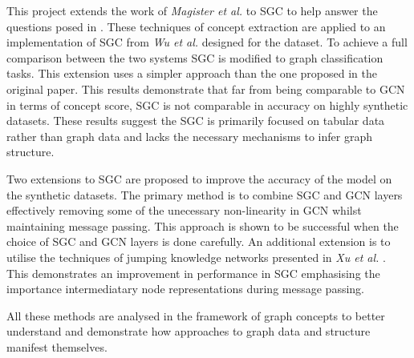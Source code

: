 
This project extends the work of \textit{Magister et al.} \cite{magister2021gcexplainer} to SGC \cite{wu2019simplifying} to help answer the questions posed in .
These techniques of concept extraction are applied to an implementation of SGC from \textit{Wu et al.} designed for the dataset.
To achieve a full comparison between the two systems SGC is modified to graph classification tasks. 
This extension uses a simpler approach than the one proposed in the original paper.
This results demonstrate that far from being comparable to GCN in terms of concept score, SGC is not comparable in accuracy on highly synthetic datasets.
These results suggest the SGC is primarily focused on tabular data rather than graph data and lacks the necessary mechanisms to infer graph structure.

Two extensions to SGC are proposed to improve the accuracy of the model on the synthetic datasets.
The primary method is to combine SGC and GCN layers effectively removing some of the unecessary non-linearity in GCN whilst maintaining message passing.
This approach is shown to be successful when the choice of SGC and GCN layers is done carefully.
An additional extension is to utilise the techniques of jumping knowledge networks presented in \textit{Xu et al.} \cite{xu2018representation}.
This demonstrates an improvement in performance in SGC emphasising the importance intermediatary node representations during message passing.

All these methods are analysed in the framework of graph concepts to better understand and demonstrate how approaches to graph data and structure manifest themselves.







